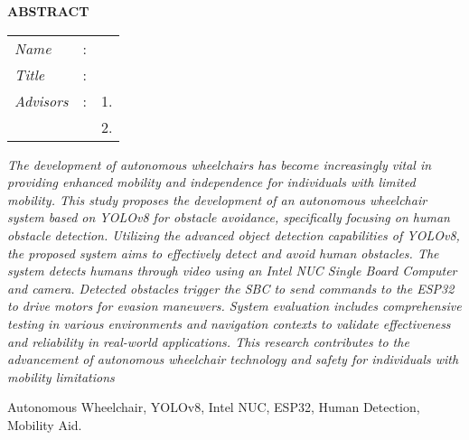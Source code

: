 \begin{center}
  \large\textbf{ABSTRACT}
\end{center}


\vspace{2ex}

\begingroup
\setlength{\tabcolsep}{0pt}

\noindent
\begin{tabularx}{\textwidth}{l >{\centering}m{3em} X}
  \emph{Name}     & : & \name{}         \\

  \emph{Title}    & : & \engtatitle{}   \\

  \emph{Advisors} & : & 1. \advisor{}   \\
                  &   & 2. \coadvisor{} \\
\end{tabularx}
\endgroup

\emph{The development of autonomous wheelchairs has become increasingly vital in providing enhanced mobility and independence for individuals with limited mobility. This study proposes the development of an autonomous wheelchair system based on YOLOv8 for obstacle avoidance, specifically focusing on human obstacle detection. Utilizing the advanced object detection capabilities of YOLOv8, the proposed system aims to effectively detect and avoid human obstacles. The system detects humans through video using an Intel NUC Single Board Computer and camera. Detected obstacles trigger the SBC to send commands to the ESP32 to drive motors for evasion maneuvers. System evaluation includes comprehensive testing in various environments and navigation contexts to validate effectiveness and reliability in real-world applications. This research contributes to the advancement of autonomous wheelchair technology and safety for individuals with mobility limitations}

Autonomous Wheelchair, YOLOv8, Intel NUC, ESP32, Human Detection,
 Mobility Aid.
